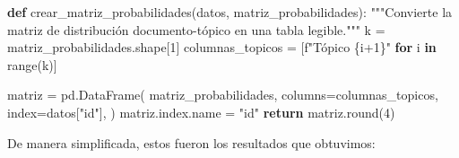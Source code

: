 \documentclass[
  spanish,
  letterpaper,
  DIV=11,
  numbers=noendperiod]{scrartcl}
\newenvironment{Shaded}{\begin{snugshade}}{\end{snugshade}}
\newcommand{\BuiltInTok}[1]{\textcolor[rgb]{0.00,0.23,0.31}{#1}}
\newcommand{\CommentTok}[1]{\textcolor[rgb]{0.37,0.37,0.37}{#1}}
\newcommand{\ControlFlowTok}[1]{\textcolor[rgb]{0.00,0.23,0.31}{\textbf{#1}}}
\newcommand{\DecValTok}[1]{\textcolor[rgb]{0.68,0.00,0.00}{#1}}
\newcommand{\KeywordTok}[1]{\textcolor[rgb]{0.00,0.23,0.31}{\textbf{#1}}}
\newcommand{\NormalTok}[1]{\textcolor[rgb]{0.00,0.23,0.31}{#1}}
\newcommand{\OperatorTok}[1]{\textcolor[rgb]{0.37,0.37,0.37}{#1}}
\newcommand{\SpecialCharTok}[1]{\textcolor[rgb]{0.37,0.37,0.37}{#1}}
\newcommand{\SpecialStringTok}[1]{\textcolor[rgb]{0.13,0.47,0.30}{#1}}
\newcommand{\StringTok}[1]{\textcolor[rgb]{0.13,0.47,0.30}{#1}}
\begin{document}
\begin{Shaded}
\begin{Highlighting}[]
\KeywordTok{def}\NormalTok{ crear\_matriz\_probabilidades(datos, matriz\_probabilidades):}
    \CommentTok{"""Convierte la matriz de distribución documento{-}tópico en una tabla legible."""}
\NormalTok{    k }\OperatorTok{=}\NormalTok{ matriz\_probabilidades.shape[}\DecValTok{1}\NormalTok{]}
\NormalTok{    columnas\_topicos }\OperatorTok{=}\NormalTok{ [}\SpecialStringTok{f"Tópico }\SpecialCharTok{\{}\NormalTok{i}\OperatorTok{+}\DecValTok{1}\SpecialCharTok{\}}\SpecialStringTok{"} \ControlFlowTok{for}\NormalTok{ i }\KeywordTok{in} \BuiltInTok{range}\NormalTok{(k)]}
    
\NormalTok{    matriz }\OperatorTok{=}\NormalTok{ pd.DataFrame(}
\NormalTok{        matriz\_probabilidades,}
\NormalTok{        columns}\OperatorTok{=}\NormalTok{columnas\_topicos,}
\NormalTok{        index}\OperatorTok{=}\NormalTok{datos[}\StringTok{"id"}\NormalTok{],}
\NormalTok{    )}
\NormalTok{    matriz.index.name }\OperatorTok{=} \StringTok{"id"}
    \ControlFlowTok{return}\NormalTok{ matriz.}\BuiltInTok{round}\NormalTok{(}\DecValTok{4}\NormalTok{)}
\end{Highlighting}
\end{Shaded}

De manera simplificada, estos fueron los resultados que obtuvimos:
\end{document}
